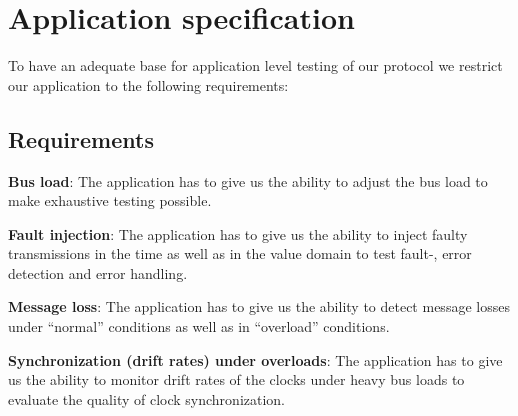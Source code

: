 \section{Application specification}
\label{sec:app:specification}

To have an adequate base for application level testing of our protocol we restrict our application to the following requirements:

\subsection{Requirements}
\label{sec:app:specification:req}

\begin{req}
\label{req:app:load}
\textbf{Bus load}: The application has to give us the ability to adjust the bus load to make exhaustive testing possible.
\end{req}

\begin{req}
\label{req:app:fault_injection}
\textbf{Fault injection}: The application has to give us the ability to inject faulty transmissions in the time as well as in the value domain to test fault-, error detection and error handling.
\end{req}

\begin{req}
\label{req:app:message_loss}
\textbf{Message loss}: The application has to give us the ability to detect message losses under ``normal'' conditions as well as in ``overload'' conditions.
\end{req}


\begin{req}
\label{req:app:sync_under_overloads}
\textbf{Synchronization (drift rates) under overloads}: The application has to give us the ability to monitor drift rates of the clocks under heavy bus loads to evaluate the quality of clock synchronization.
\end{req}


